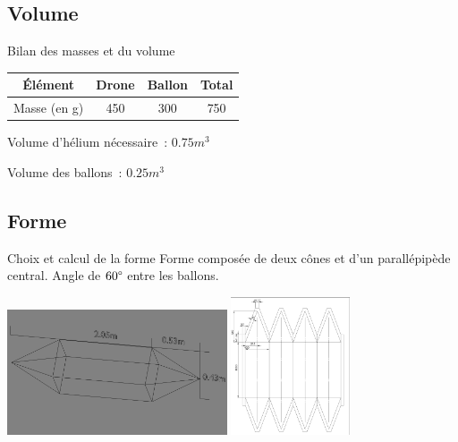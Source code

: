 \documentclass{beamer}
\begin{document}
\subsection{Volume}

\begin{frame}{Bilan des masses et du volume}
	\begin{center}
		\begin{tabular}{|c|c|c|c|}
			\hline
			Élément & Drone & Ballon & Total \\
			\hline
			Masse (en g) & 450 & 300 & 750 \\
			\hline
		\end{tabular}

	\end{center}

  Volume d'hélium nécessaire~: $0.75 m^3$

  Volume des ballons~: $0.25 m^3$
\end{frame}


\subsection{Forme}

\begin{frame}{Choix et calcul de la forme}
	Forme composée de deux cônes et d'un parallépipède central. Angle de $60\degree$ entre les ballons.
	\begin{center}
		\includegraphics[width=6.5cm]{../Images/ballon.png}
		\includegraphics[width=3.5cm, angle=90]{../Images/plan_ballon.png}
	\end{center}
\end{frame}
\end{document}
